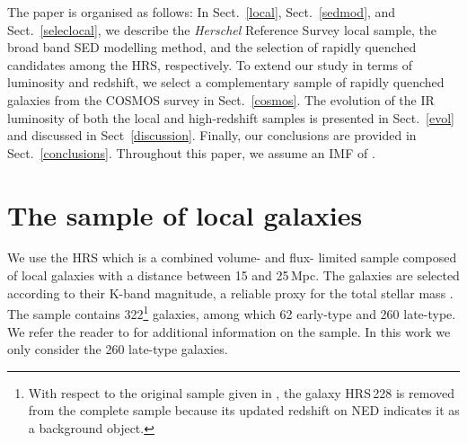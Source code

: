 \documentclass[traditabstract]{aa} %
\begin{document}
The paper is organised as follows:
In Sect.~\ref{local}, Sect.~\ref{sedmod}, and Sect.~\ref{seleclocal}, we describe the \textit{Herschel} Reference Survey \citep[HRS,][]{Boselli10a} local sample, the broad band SED modelling method, and the selection of rapidly quenched candidates among the HRS, respectively.
To extend our study in terms of luminosity and redshift, we select a complementary sample of rapidly quenched galaxies from the COSMOS survey in Sect.~\ref{cosmos}.
The evolution of the IR luminosity of both the local and high-redshift samples is presented in Sect.~\ref{evol} and discussed in Sect~\ref{discussion}.
Finally, our conclusions are provided in Sect.~\ref{conclusions}.
Throughout this paper, we assume an IMF of \cite{Salpeter55}.

\section{\label{local}The sample of local galaxies}
We use the HRS which is a combined volume- and flux- limited sample composed of local galaxies with a distance between 15 and 25\,Mpc.
The galaxies are selected according to their K-band magnitude, a reliable proxy for the total stellar mass \citep{Gavazzi96}. 
The sample contains 322\footnote{With respect to the original sample given in \cite{Boselli10a}, the galaxy HRS\,228 is removed from the complete sample because its updated redshift on NED indicates it as a background object.}  galaxies, among which 62 early-type and 260 late-type.
We refer the reader to \cite{Boselli10a} for additional information on the sample.
In this work we only consider the 260 late-type galaxies.
\end{document}
